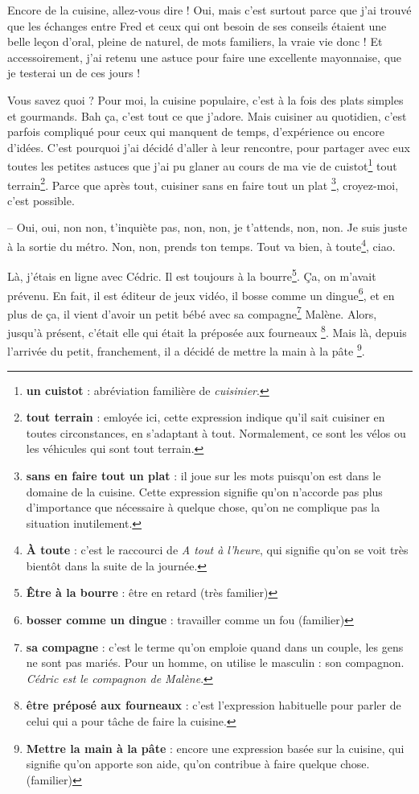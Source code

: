 \documentclass[11pt, french]{report}
\begin{document}
Encore de la cuisine, allez-vous dire ! Oui, mais c’est surtout parce que j’ai
trouvé que les échanges entre Fred et ceux qui ont besoin de ses conseils étaient
une belle leçon d’oral, pleine de naturel, de mots familiers, la vraie vie donc !
Et accessoirement, j’ai retenu une astuce pour faire une excellente mayonnaise,
que je testerai un de ces jours !

\vfill

Vous savez quoi ? Pour moi, la cuisine populaire, c’est à la fois des plats
simples et gourmands. Bah ça, c’est tout ce que j’adore. Mais cuisiner au
quotidien, c’est parfois compliqué pour ceux qui manquent de temps, d’expérience
ou encore d’idées. C’est pourquoi j’ai décidé d’aller à leur rencontre, pour
partager avec eux toutes les petites astuces que j’ai pu glaner au cours de ma
vie de cuistot\footnote{\textbf{un cuistot} : abréviation familière de
  \textit{cuisinier}.} tout terrain\footnote{\textbf{tout terrain} : emloyée ici,
  cette expression indique qu’il sait cuisiner en toutes circonstances, en
  s’adaptant à tout. Normalement, ce sont les vélos ou les véhicules qui sont
  tout terrain.}. Parce que après tout, cuisiner sans en faire tout un plat
\footnote{\textbf{sans en faire tout un plat} : il joue sur les mots puisqu’on
  est dans le domaine de la cuisine. Cette expression signifie qu’on n’accorde
  pas plus d’importance que nécessaire à quelque chose, qu’on ne complique pas
  la situation inutilement.}, croyez-moi, c’est possible.

-- Oui, oui, non non, t’inquiète pas, non, non, je t’attends, non, non. Je suis
juste à la sortie du métro. Non, non, prends ton temps. Tout va bien,
à toute\footnote{\textbf{À toute} : c’est le raccourci de
  \textit{A tout à l’heure}, qui signifie qu’on se voit très bientôt dans la
  suite de la journée.}, ciao.

Là, j’étais en ligne avec Cédric. Il est toujours à la
bourre\footnote{\textbf{Être à la bourre} : être en retard (très familier)}.
Ça, on m’avait prévenu. En fait, il est éditeur de jeux vidéo, il bosse comme
un dingue\footnote{\textbf{bosser comme un dingue} : travailler comme un
  fou (familier)}, et en plus de ça, il vient d’avoir un petit bébé avec sa
compagne\footnote{\textbf{sa compagne} : c’est le terme qu’on emploie quand
  dans un couple, les gens ne sont pas mariés. Pour un homme, on utilise le
  masculin : son compagnon. \textit{Cédric est le compagnon de Malène}.} Malène.
Alors, jusqu’à présent, c’était elle qui était la préposée aux fourneaux
\footnote{\textbf{être préposé aux fourneaux} : c’est l’expression habituelle
  pour parler de celui qui a pour tâche de faire la cuisine.}. Mais là, depuis
l’arrivée du petit, franchement, il a décidé de mettre la main à la pâte
\footnote{\textbf{Mettre la main à la pâte} : encore une expression basée sur
  la cuisine, qui signifie qu’on apporte son aide, qu’on contribue à faire
  quelque chose. (familier)}.
\end{document}
